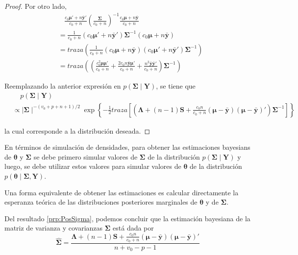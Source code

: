 \documentclass[
  10pt,
  spanish,
]{book}
\theoremstyle{definition}
\theoremstyle{definition}
\theoremstyle{definition}
\theoremstyle{definition}
\theoremstyle{remark}
\begin{document}
\begin{proof}
Por otro lado,
\begin{align*}
&\ \ \ \ \frac{c_0\boldsymbol \mu'+n\bar{\mathbf{y}}'}{c_0+n}\left(\frac{\boldsymbol \Sigma}{c_0+n}\right)^{-1}\frac{c_0\boldsymbol \mu+n\bar{\mathbf{y}}}{c_0+n}\\
&=\frac{1}{c_0+n}(c_0\boldsymbol \mu'+n\bar{\mathbf{y}}')\boldsymbol \Sigma^{-1}(c_0\boldsymbol \mu+n\bar{\mathbf{y}})\\
&=traza\left(\frac{1}{c_0+n}(c_0\boldsymbol \mu+n\bar{\mathbf{y}})(c_0\boldsymbol \mu'+n\bar{\mathbf{y}}')\boldsymbol \Sigma^{-1}\right)\\
&=traza\left(\left(\frac{c_0^2\boldsymbol \mu\boldsymbol \mu'}{c_0+n}+\frac{2c_0n\bar{\mathbf{y}}\boldsymbol \mu'}{c_0+n}+\frac{n^2\bar{\mathbf{y}}\bar{\mathbf{y}}'}{c_0+n}\right)\boldsymbol \Sigma^{-1}\right)
\end{align*}

Reemplazando la anterior expresión en \(p(\boldsymbol \Sigma\mid\mathbf{Y})\), se tiene que
\begin{align*}
&\ \ \ \ \ p(\boldsymbol \Sigma\mid\mathbf{Y})\\
&\propto \mid\boldsymbol \Sigma\mid^{-(v_0+p+n+1)/2}\exp\left\{-\frac{1}{2}traza\left[\left(\boldsymbol \Lambda+(n-1)\mathbf{S}+\frac{c_0n}{c_0+n}(\boldsymbol \mu-\bar{\mathbf{y}})(\boldsymbol \mu-\bar{\mathbf{y}})'\right)\boldsymbol \Sigma^{-1}\right]\right\}
\end{align*}

la cual corresponde a la distribución deseada.
\end{proof}

En términos de simulación de densidades, para obtener las estimaciones bayesians de \(\boldsymbol \theta\) y \(\boldsymbol \Sigma\) se debe primero simular valores de \(\boldsymbol \Sigma\) de la distribución \(p(\boldsymbol \Sigma\mid \mathbf{Y})\) y luego, se debe utilizar estos valores para simular valores de \(\boldsymbol \theta\) de la distribución \(p(\boldsymbol \theta\mid \boldsymbol \Sigma,\mathbf{Y})\).

Una forma equivalente de obtener las estimaciones es calcular directamente la esperanza teórica de las distribuciones posteriores marginales de \(\boldsymbol \theta\) y de \(\boldsymbol \Sigma\).

Del resultado \ref{prp:PosSigma}, podemos concluir que la estimación bayesiana de la matriz de varianza y covarianzas \(\boldsymbol \Sigma\) está dada por
\begin{equation*}
\hat{\boldsymbol \Sigma}=\dfrac{\boldsymbol \Lambda+(n-1)\mathbf{S}+\frac{c_0n}{c_0+n}(\boldsymbol \mu-\bar{\mathbf{y}})(\boldsymbol \mu-\bar{\mathbf{y}})'}{n+v_0-p-1}
\end{equation*}
\end{document}
